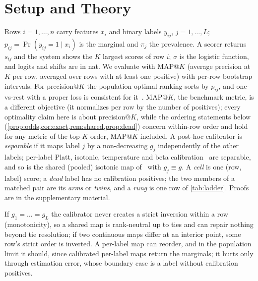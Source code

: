 \documentclass[runningheads]{llncs}
\makeatletter
\newcommand{\mapk}{\mathrm{MAP}@K\xspace}
\makeatother
\begin{document}
\section{Setup and Theory}
\label{sec:theory}

Rows $i=1,\dots,n$ carry features $x_i$ and binary labels $y_{ij}$, $j=1,\dots,L$; $p_{ij}=\Pr(y_{ij}=1\mid x_i)$ is the marginal and $\pi_j$ the prevalence. A scorer returns $s_{ij}$ and the system shows the $K$ largest scores of row $i$; $\sigma$ is the logistic function, and logits and shifts are in nat. We evaluate with $\mapk$ (average precision at $K$ per row, averaged over rows with at least one positive) with per-row bootstrap intervals. For precision@$K$ the population-optimal ranking sorts by $p_{ij}$, and one-vs-rest with a proper loss is consistent for it~\cite{Koyejo2015Consistent,Menon2019Reductions}. $\mapk$, the benchmark metric, is a different objective (it normalizes per row by the number of positives); every optimality claim here is about precision@$K$, while the ordering statements below (\cref{prop:odds,cor:exact,rem:shared,prop:dead}) concern within-row order and hold for any metric of the top-$K$ order, $\mapk$ included. A post-hoc calibrator is \emph{separable} if it maps label $j$ by a non-decreasing $g_j$ independently of the other labels; per-label Platt, isotonic, temperature and beta calibration~\cite{Platt1999,Zadrozny2002,Guo2017Calibration,Kull2017Beta} are separable, and so is the shared (pooled) isotonic map of~\cite{Ullah2025XMLCCalib} with $g_j\equiv g$. A \emph{cell} is one (row, label) score; a \emph{dead} label has no calibration positives; the two members of a matched pair are its \emph{arms} or \emph{twins}, and a \emph{rung} is one row of \cref{tab:ladder}. Proofs are in the supplementary material.

\begin{remark}
\label{rem:shared}
If $g_1=\dots=g_L$ the calibrator never creates a strict inversion within a row (monotonicity), so a shared map is rank-neutral up to ties and can repair nothing beyond tie resolution; if two continuous maps differ at an interior point, some row's strict order is inverted. A per-label map can reorder, and in the population limit it should, since calibrated per-label maps return the marginals; it hurts only through estimation error, whose boundary case is a label without calibration positives.
\end{remark}
\end{document}
